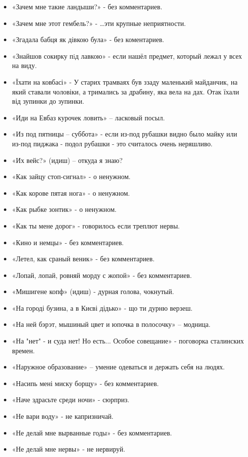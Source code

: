 \begin{itemize}
\item  «Зачем мне такие ландыши?» - без комментариев.
\item  «Зачем мне этот гембель?» - …эти крупные неприятности.
\item  «Згадала бабця як дівкою була» - без коментариев.
\item  «Знайшов сокирку пiд лавкою» - если нашёл предмет, который лежал у всех на виду.
\item  «Їхати на ковбасі» - У старих трамваях був ззаду маленький майданчик, на який ставали чоловіки, а тримались за драбину, яка вела на дах. Отак їхали від зупинки до зупинки.
\item  «Иди на Евбаз курочек ловить» – ласковый посыл.
\item  «Из под пятницы – суббота» - если из-под рубашки видно было майку или из-под пиджака - подол рубашки - это считалось очень неряшливо.
\item  «Их вейс?» (идиш) – откуда я знаю?
\item  «Как зайцу стоп-сигнал» - о ненужном.
\item  «Как корове пятая нога» - о ненужном.
\item  «Как рыбке зонтик» - о ненужном.
\item  «Как ты мене дорог» - говорилось если треплют  нервы.
\item  «Кино и немцы» - без комментариев.
\item  «Летел, как сраный веник» - без комментариев.
\item  «Лопай, лопай, ровняй морду с жопой» - без комментариев.
\item  «Мишигене копф» (идиш) - дурная голова, чокнутый.
\item  «На городі бузина, а в Києві дідько» - що ти дурню верзеш.
\item  «На ней бэрэт, мышиный цвет и юпочка в полосочку» – модница.
\item  «На "нет" - и суда нет! Но есть... Особое совещание» - поговорка сталинских времен.
\item  «Наружное образование» – умение одеваться и держать себя на людях.
\item  «Насипь мені миску борщу» - без комментариев.
\item  «Наче здрасьте среди ночи» - сюрприз.
\item  «Не вари воду» - не капризничай.
\item  «Не делай мне вырванные годы» - без комментариев. 
\item  «Не делай мне нервы» - не нервируй.

\end{itemize}
